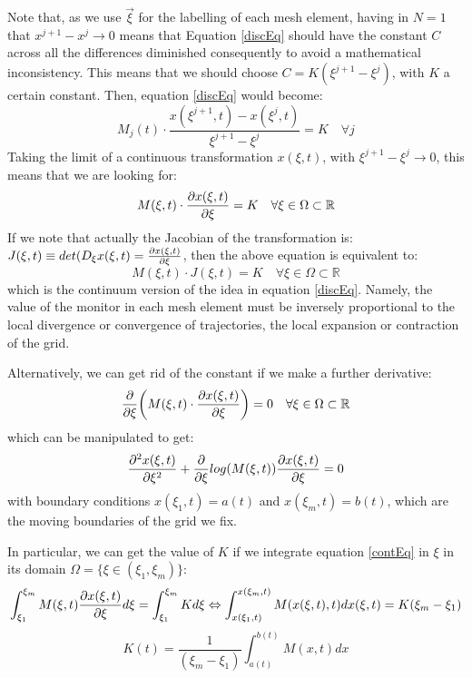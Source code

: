 \documentclass[11pt, a4paper]{article} %
\newcommand{\R}{\mathbb{R}} %
\begin{document}
Note that, as we use $\vec{\xi}$ for the labelling of each mesh element, having in $N=1$ that $x^{j+1}-x^j\rightarrow 0$ means that Equation \eqref{discEq} should have the constant $C$ across all the differences diminished consequently to avoid a mathematical inconsistency. This means that we should choose $C=K(\xi^{j+1}-\xi^j)$, with $K$ a certain constant. Then, equation \eqref{discEq} would become:
\begin{equation}
M_j(t)\cdot \frac{x(\xi^{j+1},t)-x(\xi^{j},t)}{\xi^{j+1}-\xi^j}=K \quad \forall j
\end{equation}
Taking the limit of a continuous transformation $x(\xi,t)$, with $\xi^{j+1}-\xi^j\rightarrow 0$, this means that we are looking for:
\begin{equation}\label{contEq}
M(\xi,t)\cdot \pdv{x(\xi,t)}{\xi}=K \quad \forall \xi\in \Omega\subset \R
\end{equation}
If we note that actually the Jacobian of the transformation is: $J(\xi,t)\equiv det(D_{\xi}x(\xi,t)=\pdv{x(\xi,t)}{\xi}$, then the above equation is equivalent to:
\begin{equation}
M(\xi,t)\cdot J(\xi,t)=K \quad \forall \xi\in \Omega\subset \R
\end{equation}
which is the continuum version of the idea in equation \eqref{discEq}. Namely, the value of the monitor in each mesh element must be inversely proportional to the local divergence or convergence of trajectories, the local expansion or contraction of the grid.

Alternatively, we can get rid of the constant if we make a further derivative:
\begin{equation}
\pdv{}{\xi}\qty(M(\xi,t)\cdot \pdv{x(\xi,t)}{\xi})=0 \quad \forall \xi\in \Omega\subset \R
\end{equation}
which can be manipulated to get:
\begin{equation}
\pdv[2]{x(\xi,t)}{\xi}+\pdv{}{\xi}log(M(\xi,t))\pdv{x(\xi,t)}{\xi}=0
\end{equation}
with boundary conditions $x(\xi_1,t)=a(t)$ and $x(\xi_m,t)=b(t)$, which are the moving boundaries of the grid we fix.

In particular, we can get the value of $K$ if we integrate equation \eqref{contEq} in $\xi$ in its domain $\Omega=\{\xi\in(\xi_1,\xi_m)\}$:
\begin{equation}
\int^{\xi_m}_{\xi_1} M(\xi,t) \pdv{x(\xi,t)}{\xi} d\xi=\int^{\xi_m}_{\xi_1} K d \xi  \Leftrightarrow \int^{x(\xi_m,t)}_{x(\xi_1,t)} M(x(\xi,t),t) dx(\xi,t)=K(\xi_m-\xi_1)
\end{equation}
\begin{equation}
K(t)=\frac{1}{(\xi_m-\xi_1)}\int^{b(t)}_{a(t)} M(x,t) dx
\end{equation}
\end{document}
